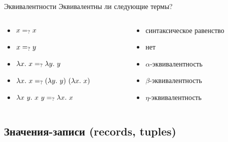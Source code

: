     \begin{frame}[fragile]{Эквивалентности}
        Эквивалентны ли следующие термы?
        \vspace{-1em}
        \begin{columns}[onlytextwidth]
            \begin{column}[t]{0.4\textwidth}
                \begin{itemize}
                    \item[\todo] $x =_{?} x$
                    \item[\todo] $x =_{?} y$
                    \item[\todo] $\lambda x. ~ x =_{?} \lambda y. ~ y$
                    \item[\todo] $\lambda x. ~ x =_{?} (\lambda y. ~ y) ~ (\lambda x. ~ x)$
                    \item[\todo] $\lambda x ~ y. ~ x ~ y =_{?} \lambda x. ~ x$
                \end{itemize}
            \end{column}\hfill%
            \begin{column}[t]{0.485\textwidth}
                \begin{itemize}
                    \item[\answer] \pause синтаксическое равенство
                    \item[\answer] \pause нет
                    \item[\answer] \pause $\alpha$-эквивалентность
                    \item[\answer] \pause $\beta$-эквивалентность
                    \item[\answer] \pause $\eta$-эквивалентность
                \end{itemize}
            \end{column}
        \end{columns}
    \end{frame}


    \subsection{Значения-записи (records, tuples)}

